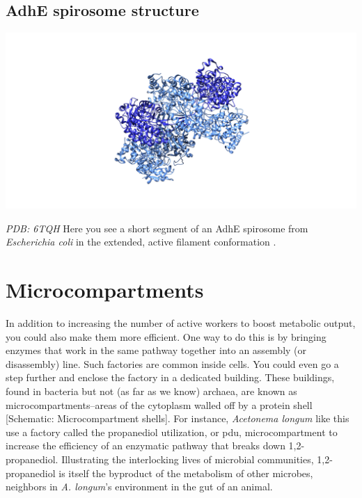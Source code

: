 \documentclass[]{tufte-book}
\begin{document}
\subsection{AdhE spirosome structure}\label{AdhE_spirosome_structure}

\includegraphics{img/schematics/4_5_1}

\emph{PDB: 6TQH} Here you see a short segment of an AdhE spirosome from
\emph{Escherichia coli} in the extended, active filament conformation
\citep{pony2020}.

\section{Microcompartments}\label{microcompartments}

In addition to increasing the number of active workers to boost
metabolic output, you could also make them more efficient. One way to do
this is by bringing enzymes that work in the same pathway together into
an assembly (or disassembly) line. Such factories are common inside
cells. You could even go a step further and enclose the factory in a
dedicated building. These buildings, found in bacteria but not (as far
as we know) archaea, are known as microcompartments--areas of the
cytoplasm walled off by a protein shell {[}Schematic: Microcompartment
shells{]}. For instance, \emph{Acetonema longum} like this use a factory
called the propanediol utilization, or pdu, microcompartment to increase
the efficiency of an enzymatic pathway that breaks down 1,2-propanediol.
Illustrating the interlocking lives of microbial communities,
1,2-propanediol is itself the byproduct of the metabolism of other
microbes, neighbors in \emph{A. longum}'s environment in the gut of an
animal.
\end{document}
